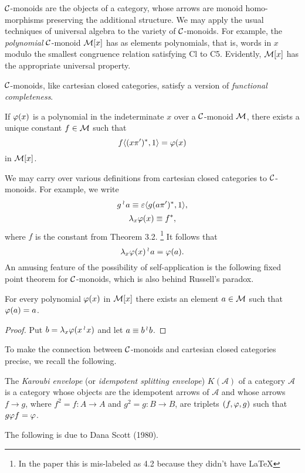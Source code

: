 $\mathcal C$-monoids are the objects of a category, whose arrows are monoid homo-
morphisms preserving the additional structure. We may apply the usual
techniques of universal algebra to the variety of $\mathcal C$-monoids. For example, the
{\em polynomial} $\mathcal C$-monoid ${\mathcal M}[x]$ has as elements polynomials, that is, words in $x$
modulo the smallest congruence relation satisfying Cl to C5. Evidently,
${\mathcal M}[x]$ has the appropriate universal property.

$\mathcal C$-monoids, like cartesian closed categories, satisfy a version of
{\em functional completeness}.

\begin{thm}
If $\varphi(x)$ is a polynomial in the indeterminate $x$ over a
$\mathcal C$-monoid ${\mathcal M}$, there exists a unique constant $f\in {\mathcal M}$ such that
\[
f\langle (x\pi')^*, 1 \rangle = \varphi(x)
\]
in ${\mathcal M}[x]$.
\end{thm}
We may carry over various definitions from cartesian closed categories
to $\mathcal C$-monoids. For example, we write
\[
g\mathop{{}^\wr}\kern-.8pt a \equiv \varepsilon \langle g(a \pi')^*,1\rangle,
\]
\[
\lambda_x \varphi(x) \equiv f^*,
\]
where $f$ is the constant from Theorem 3.2.%
\footnote{In the paper this is mis-labeled as 4.2 because they didn't have \LaTeX}
It follows that
\[
\lambda_x \varphi(x) \mathop{{}^\wr}\kern-.8pt a = \varphi(a).
\]
An amusing feature of the possibility of self-application is the
following fixed point theorem for $\mathcal C$-monoids, which is also behind Russell's
paradox.

\begin{prop}
For every polynomial $\varphi(x)$ in ${\mathcal M}[x]$ there exists an
element $a \in {\mathcal M}$ such that $\varphi(a) = a$.
\end{prop}

\begin{proof}
Put $b = \lambda_x \varphi(x \mathop{{}^\wr}\kern-.8pt x)$ and let $a \equiv b \mathop{{}^\wr}\kern-.8pt b$.
\end{proof}

To make the connection between $\mathcal C$-monoids and cartesian closed categories
precise, we recall the following.

\begin{defn}
The {\em Karoubi envelope} (or {\em idempotent splitting envelope})
$K(\mathcal A)$ of a category $\mathcal A$ is a category whose objects
are the idempotent arrows of $\mathcal A$ and whose arrows $f \to g$, where
$f^2 = f: A \to A$ and $g^2 = g: B \to B$, are triplets
$(f, \varphi, g)$ such that $g\varphi f = \varphi$.
\end{defn}

The following is due to Dana Scott (1980).

